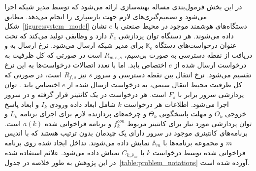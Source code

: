 در این بخش فرمول‌بندی مساله بهینه‌سازی ارائه می‌شود که توسط مدیر شبکه اجرا می‌شود و تصمیم‌گیری‌های لازم جهت بارسپاری را انجام می‌دهد. مطابق شکل~\ref{figure:system_model} دستگاه‌های هوشمند موجود در محیط صنعتی با $e$ نشان داده می‌شوند. هر دستگاه توان پردازشی $F_e$ دارد و وظایفی تولید می‌کند که تحت عنوان درخواست‌های دستگاه $\mathbb{K}_e$ برای مدیر شبکه ارسال می‌شود. نرخ ارسال به و دریافت از نقطه دسترسی به صورت بی‌سیم، $R_{w,e,s}$ است در صورتی که کل ظرفیت  به درخواست ارسال شده از $e$ اختصاص یابد. اما با تعدد اتصالات درخواست‌ها به  این نرخ تقسیم می‌شود. نرخ انتقال بین نقطه دسترسی و سرور $s$ نیز $R_{f,s}$ است، در صورتی که کل ظرفیت محیط انتقال سیمی، به درخواست ارسال شده از $e$ اختصاص یابد . توان پردازشی سرور برابر با $F_s$ است. هر درخواست در یک کانتینر قرار گرفته و در سرور اجرا می‌شود. اطلاعات هر درخواست $k$ شامل ابعاد داده ورودی $I_k$ و ابعاد پاسخ خروجی $O_k$ و مهلت پاسخگویی $\Theta_k$ و چرخه‌های پردازنده لازم برای اجرای برنامه $L_k$ و توان پردازشی مورد نیاز برای کانتینر مربوط $f^{con}_k$  و برنامه فراخوانی شده $a(k)$ است. برنامه‌های کانتینری موجود در سرور دارای یک چیدمان بدون ترتیب هستند که با اندیس $m$ و مجموعه برنامه‌ها با $\mathbb{A}_m$ نمایش داده می‌شوند. تداخل ایجاد شده روی برنامه فراخوانی شده توسط درخواست $k$ با $C_{k,\mathbb{A}_m}$ نمیاش داده می‌شود. علائم استفاده شده در این پژوهش به طور خلاصه در جدول~\ref{table:problem_notations} آورده شده است.

